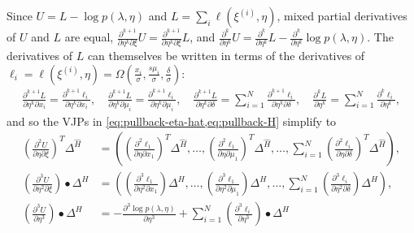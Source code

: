 \documentclass{article}
\begin{document}
Since $U = L - \log p(\lambda, \eta)$ and $L = \sum_i \ell(\xi^{(i)}, \eta)$, mixed partial derivatives of $U$ and $L$ are equal, $\frac{\partial^{k+1}}{\partial \eta^k \partial \xi} U = \frac{\partial^{k+1}}{\partial \eta^k \partial \xi} L$, and $\frac{\partial^k}{\partial \eta^k} U = \frac{\partial^k}{\partial \eta^k} L - \frac{\partial^k}{\partial \eta^k} \log p(\lambda, \eta)$.
The derivatives of $L$ can themselves be written in terms of the derivatives of $\ell_i = \ell(\xi^{(i)}, \eta) = \Omega(\frac{x_i}{\sigma}, \frac{s \mu_i}{\sigma}, \frac{\delta}{\sigma})$:
%
\begin{align}
  \frac{\partial^{k+1} L}{\partial \eta^k \partial x_i} = \frac{\partial^{k+1} \ell_i}{\partial \eta^k \partial x_i},
  \quad
  \frac{\partial^{k+1} L}{\partial \eta^k \partial \mu_i} = \frac{\partial^{k+1} \ell_i}{\partial \eta^k \partial \mu_i},
  \quad
  \frac{\partial^{k+1} L}{\partial \eta^k \partial \delta} = \sum_{i=1}^N \frac{\partial^{k+1} \ell_i}{\partial \eta^k \partial \delta},
  \quad
  \frac{\partial^{k} L}{\partial \eta^{k}} = \sum_{i=1}^N \frac{\partial^{k} \ell_i}{\partial \eta^{k}},
\end{align}
%
and so the VJPs in \cref{eq:pullback-eta-hat,eq:pullback-H} simplify to
%
\begin{align}
  \left(\frac{\partial^2 U}{\partial \eta \partial \xi}\right)^{T} \Delta^{\hat{H}} & = \left(
  \left(\frac{\partial^2 \ell_1}{\partial \eta \partial x_1}\right)^{T} \Delta^{\hat{H}}, \ldots,
  \left(\frac{\partial^2 \ell_1}{\partial \eta \partial \mu_1}\right)^{T} \Delta^{\hat{H}}, \ldots,
  \sum_{i=1}^N \left(\frac{\partial^2 \ell_i}{\partial \eta \partial \delta}\right)^{T} \Delta^{\hat{H}}
  \right), \label{eq:pullback-eta-hat-simplified}                                                                                                                                                                                                                                   \\
  \left(\frac{\partial^3 U}{\partial \eta^2 \partial \xi}\right) \bullet \Delta^H   & = \left(
  \left(\frac{\partial^3 \ell_1}{\partial \eta^2 \partial x_1}\right) \Delta^H, \ldots,
  \left(\frac{\partial^3 \ell_1}{\partial \eta^2 \partial \mu_1}\right) \Delta^H, \ldots,
  \sum_{i=1}^N \left(\frac{\partial^3 \ell_i}{\partial \eta^2 \partial \delta}\right) \Delta^H
  \right), \label{eq:pullback-H-Phi-eta-squared-simplified}                                                                                                                                                                                                                         \\
  \left(\frac{\partial^3 U}{\partial \eta^3}\right) \bullet \Delta^H                & = -\frac{\partial^3 \log p(\lambda, \eta)}{\partial \eta^3} + \sum_{i=1}^N \left(\frac{\partial^3 \ell_i}{\partial \eta^3}\right) \bullet \Delta^H \label{eq:pullback-H-eta-cubed-simplified}
\end{align}
\end{document}
